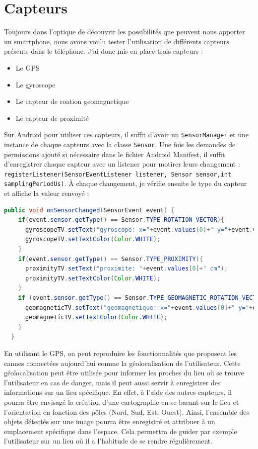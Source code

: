 \documentclass[UTF8]{EPURapport}
\begin{document}
\section{Capteurs}

Toujours dans l'optique de découvrir les possibilités que peuvent nous apporter un smartphone, nous avons voulu tester l'utilisation de différents capteurs présents dans le téléphone. J'ai donc mis en place trois capteurs : \\

\begin{itemize}
  \item Le GPS
  \item Le gyroscope
  \item Le capteur de roation geomagnetique
  \item Le capteur de proximité \\
\end{itemize}

Sur Android pour utiliser ces capteurs, il suffit d'avoir un \verb|SensorManager| et une instance de chaque capteurs avec la classe \verb|Sensor|. Une fois les demandes de permissions ajouté si nécessaire dans le fichier Android Manifest, il suffit d'enregistrer chaque capteur avec un listener pour motirer leurs changement : \verb|registerListener(SensorEventListener listener, Sensor sensor,int samplingPeriodUs)|. À chaque changement, je vérifie ensuite le type du capteur et affiche la valeur renvoyé : \\

\begin{lstlisting}[language=Java]
public void onSensorChanged(SensorEvent event) {
    if(event.sensor.getType() == Sensor.TYPE_ROTATION_VECTOR){
      gyroscopeTV.setText("gyroscope: x="+event.values[0]+" y="+event.values[1]+" z="+event.values[2]);
      gyroscopeTV.setTextColor(Color.WHITE);
    }
    if(event.sensor.getType() == Sensor.TYPE_PROXIMITY){
      proximityTV.setText("proximite: "+event.values[0]+" cm");
      proximityTV.setTextColor(Color.WHITE);
    }
    if (event.sensor.getType() == Sensor.TYPE_GEOMAGNETIC_ROTATION_VECTOR){
      geomagneticTV.setText("geomagnetique: x="+event.values[0]+" y="+event.values[1]+" z="+event.values[2]);
      geomagneticTV.setTextColor(Color.WHITE);
    }
  }
\end{lstlisting}

En utilisant le GPS, on peut reproduire les fonctionnalités que proposent les cannes connectées aujourd'hui comme la géolocalisation de l'utilisateur. Cette géolocalisation peut être utilisée pour informer les proches du lieu où se trouve l'utilisateur en cas de danger, mais il peut aussi servir à enregistrer des informations sur un lieu spécifique. En effet, à l'aide des autres capteurs, il pourra être envisagé la création d'une cartographie en se basant sur le lieu et l'orientation en fonction des pôles (Nord, Sud, Est, Ouest). Ainsi, l'ensemble des objets détectés sur une image pourra être enregistré et attribuer à un emplacement spécifique dans l'espace. Cela permettra de guider par exemple l'utilisateur sur un lieu où il a l'habitude de se rendre régulièrement.
\end{document}
